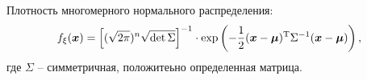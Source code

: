 Плотность многомерного нормального распределения:
\begin{equation*}
    f_\xi (\mbox{\boldmath $x$}) = \left[
        (\sqrt{2\pi})^n \sqrt{\det \Sigma}
    \right]^{-1} \cdot \exp\left(
        - \frac{1}{2} (\mbox{\boldmath $x$}-\mbox{\boldmath $\mu$})^{\text{T}} \Sigma^{-1} (\mbox{\boldmath $x$} - \mbox{\boldmath $\mu$})
    \right),
\end{equation*}
где $\Sigma$ -- симметричная, положитеьно определенная матрица. 







% 
% 
